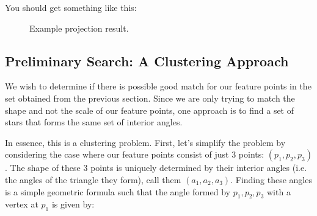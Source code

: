 \documentclass[paper=a4, fontsize=11pt]{scrartcl} %
\begin{document}


You should get something like this:
\begin{figure}[!h]
\caption{Example projection result.}
\end{figure}

\subsection{Preliminary Search: A Clustering Approach}

We wish to determine if there is possible good match for our feature points in the set obtained from the previous section.  Since we are only trying to match the shape and not the scale of our feature points, one approach is to find a set of stars that forms the same set of interior angles.

In essence, this is a clustering problem. First, let's simplify the problem by considering the case where our feature points consist of just 3 points: $(p_1,p_2,p_3)$. The shape of these 3 points is uniquely determined by their interior angles (i.e. the angles of the triangle they form), call them $(a_1,a_2,a_3)$. Finding these angles is a simple geometric formula such that the angle formed by $p_1, p_2, p_3$ with a vertex at $p_1$ is given by:
\end{document}
